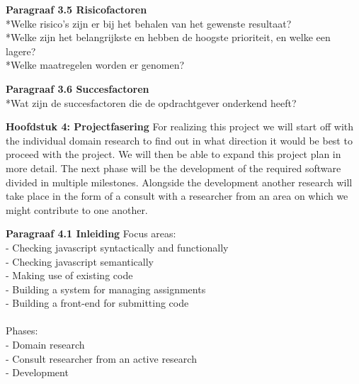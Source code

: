 \documentclass{article}
\begin{document}
\noindent
\textbf{Paragraaf 3.5 Risicofactoren}
\\*Welke risico's zijn er bij het behalen van het gewenste resultaat?
\\*Welke zijn het belangrijkste en hebben de hoogste prioriteit, en welke een lagere?
\\*Welke maatregelen worden er genomen?
\newline

\noindent
\textbf{Paragraaf 3.6 Succesfactoren}
\\*Wat zijn de succesfactoren die de opdrachtgever onderkend heeft?
\newline
\newline

\textbf{Hoofdstuk 4: Projectfasering}
For realizing this project we will start off with the individual domain research to find out in what direction it would be best to proceed with the project. We will then be able to expand this project plan in more detail. The next phase will be the development of the required software divided in multiple milestones. Alongside the development another research will take place in the form of a consult with a researcher from an area on which we might contribute to one another.
\newline

\noindent
\textbf{Paragraaf 4.1 Inleiding}
Focus areas:\\
- Checking javascript syntactically and functionally\\
- Checking javascript semantically\\
- Making use of existing code\\
- Building a system for managing assignments\\
- Building a front-end for submitting code\\
\\
Phases:\\
- Domain research\\
- Consult researcher from an active research\\
- Development\\
\\
\end{document}
